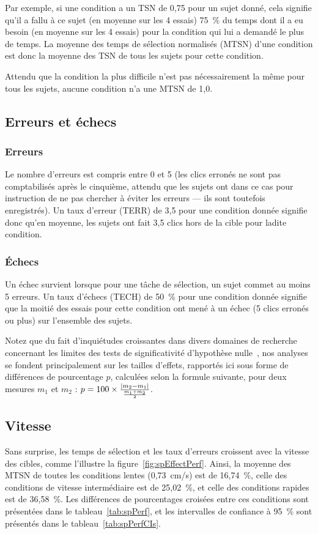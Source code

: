 	Par exemple, si une condition a un TSN de 0,75 pour un sujet donné, cela signifie qu'il a fallu à ce sujet (en moyenne sur les 4 essais) 75~\%{} du temps dont il a eu besoin (en moyenne sur les 4 essais) pour la condition qui lui a demandé le plus de temps. La moyenne des temps de sélection normalisés (MTSN) d'une condition est donc la moyenne des TSN de tous les sujets pour cette condition.
	
	Attendu que la condition la plus difficile n'est pas nécessairement la même pour tous les sujets, aucune condition n'a une MTSN de 1,0.
	
	\subsection{Erreurs et échecs}
	\subsubsection{Erreurs}
	Le nombre d'erreurs est compris entre 0 et 5 (les clics erronés ne sont pas comptabilisés après le cinquième, attendu que les sujets ont dans ce cas pour instruction de ne pas chercher à éviter les erreurs --- ils sont toutefois enregistrés). Un taux d'erreur (TERR) de 3,5 pour une condition donnée signifie donc qu'en moyenne, les sujets ont fait 3,5 clics hors de la cible pour ladite condition.
	
	\subsubsection{Échecs}
	Un échec survient lorsque pour une tâche de sélection, un sujet commet au moins 5 erreurs. 	Un taux d'échecs (TECH) de 50~\%{} pour une condition donnée signifie que la moitié des essais pour cette condition ont mené à un échec (5 clics erronés ou plus) sur l'ensemble des sujets.
	
	Notez que du fait d'inquiétudes croissantes dans divers domaines de recherche concernant les limites des tests de significativité d'hypothèse nulle~\cite{dragicevic2014running, cumming2014new}, nos analyses se fondent principalement sur les tailles d'effets, rapportés ici sous forme de différences de pourcentage $p$, calculées selon la formule suivante, pour deux mesures $m_{1}$ et $m_{2}$ : $p = 100 \times \frac{\abs*{m_{2} - m_{1}}}{\frac{m_{1} + m_{2}}{2}}$.

	\subsection{Vitesse}
	\label{sub:spEffect}
	Sans surprise, les temps de sélection et les taux d'erreurs croissent avec la vitesse des cibles, comme l'illustre la figure~\ref{fig:spEffectPerf}. Ainsi, la moyenne des MTSN de toutes les conditions lentes (0,73~cm/s) est de 16,74~\%{}, celle des conditions de vitesse intermédiaire est de 25,02~\%{}, et celle des conditions rapides est de 36,58~\%{}. Les différences de pourcentages croisées entre ces conditions sont présentées dans le tableau~\ref{tab:spPerf}, et les intervalles de confiance à 95~\%{} sont présentés dans le tableau~\ref{tab:spPerfCIs}.

